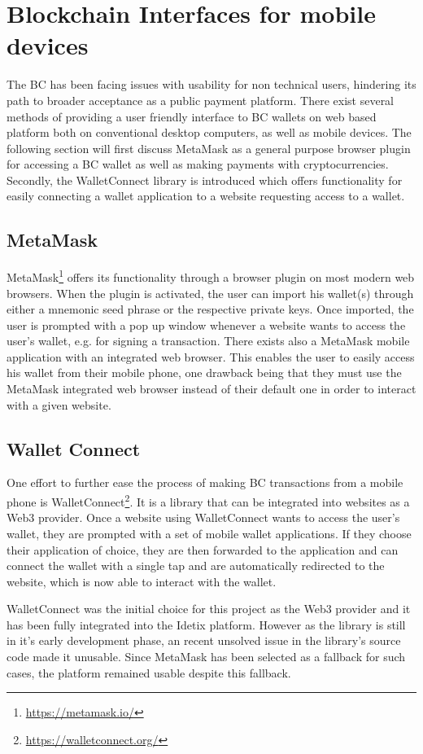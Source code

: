 \section{Blockchain Interfaces for mobile devices}

The BC has been facing issues with usability for non technical users, hindering its path to broader acceptance as a public payment platform. There exist several methods of providing a user friendly interface to BC wallets on web based platform both on conventional desktop computers, as well as mobile devices. The following section will first discuss MetaMask as a general purpose browser plugin for accessing a BC wallet as well as making payments with cryptocurrencies. Secondly, the WalletConnect library is introduced which offers functionality for easily connecting a wallet application to a website requesting access to a wallet.

\subsection{MetaMask}
MetaMask\footnote{\href{https://metamask.io/}{https://metamask.io/}} offers its functionality through a browser plugin on most modern web browsers. When the plugin is activated, the user can import his wallet(s) through either a mnemonic seed phrase or the respective private keys. Once imported, the user is prompted with a pop up window whenever a website wants to access the user's wallet, e.g. for signing a transaction. There exists also a MetaMask mobile application with an integrated web browser. This enables the user to easily access his wallet from their mobile phone, one drawback being that they must use the MetaMask integrated web browser instead of their default one in order to interact with a given website. 

\subsection{Wallet Connect}
One effort to further ease the process of making BC transactions from a mobile phone is WalletConnect\footnote{\href{https://walletconnect.org/}{https://walletconnect.org/}}. It is a library that can be integrated into websites as a Web3 provider. Once a website using WalletConnect wants to access the user's wallet, they are prompted with a set of mobile wallet applications. If they choose their application of choice, they are then forwarded to the application and can connect the wallet with a single tap and are automatically redirected to the website, which is now able to interact with the wallet.

WalletConnect was the initial choice for this project as the Web3 provider and it has been fully integrated into the Idetix platform. However as the library is still in it's early development phase, an recent unsolved issue in the library's source code made it unusable. Since MetaMask has been selected as a fallback for such cases, the platform remained usable despite this fallback.
